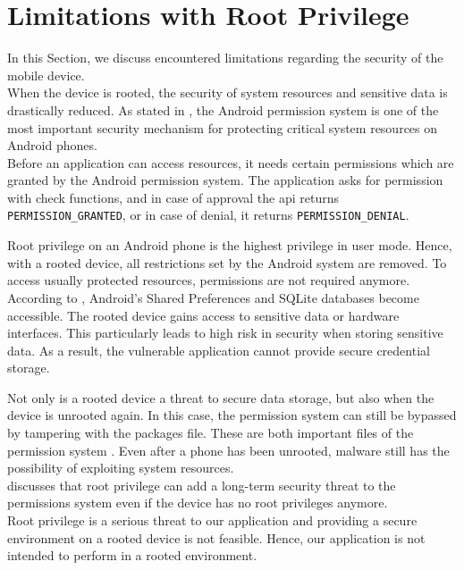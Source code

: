 \section{Limitations with Root Privilege} \label{limitations}
In this Section, we discuss encountered limitations regarding the security of the mobile device. \\
When the device is rooted, the security of system resources and sensitive data is drastically reduced. As stated in \cite{ZhangWJWL14}, the Android permission system is one of the most important security mechanism for protecting critical system resources on Android phones. \\
Before an application can access resources, it needs certain permissions which are granted by the Android permission system. The application asks for permission with check functions, and in case of approval the \gls{api} returns \texttt{PERMISSION\_GRANTED}, or in case of denial, it returns \texttt{PERMISSION\_DENIAL}.

Root privilege on an Android phone is the highest privilege in user mode. Hence, with a rooted device, all restrictions set by the Android system are removed. To access usually protected resources, permissions are not required anymore. According to \cite{ShezanAI17}, Android's Shared Preferences and SQLite databases become accessible. The rooted device gains access to sensitive data or hardware interfaces. This particularly leads to high risk in security when storing sensitive data. As a result, the vulnerable application cannot provide secure credential storage.

Not only is a rooted device a threat to secure data storage, but also when the device is unrooted again. In this case, the permission system can still be bypassed by tampering with the packages file. These are both important files of the permission system \cite{ZhangWJWL14}. Even after a phone has been unrooted, malware still has the possibility of exploiting system resources. \\ \cite{ZhangWJWL14} discusses that root privilege can add a long-term security threat to the permissions system even if the device has no root privileges anymore. \\
Root privilege is a serious threat to our application and providing a secure environment on a rooted device is not feasible. Hence, our application is not intended to perform in a rooted environment.